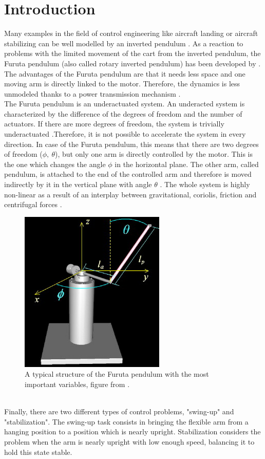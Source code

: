 \section{Introduction}
Many examples in the field of control engineering like aircraft landing or 
aircraft stabilizing can be well modelled by an inverted 
pendulum \citep{akhtaruzzaman2010modeling}. As a reaction to problems with the 
limited movement of the cart from 
the inverted pendulum, the Furuta pendulum (also called rotary inverted 
pendulum) 
has been developed by 
\cite{furuta1992swing}. The advantages of the Furuta pendulum are that 
it 
needs less space and one moving arm is directly linked to the motor. Therefore, 
the dynamics is less unmodeled thanks to a power transmission mechanism 
\citep{furuta1992swing}. \\
The Furuta pendulum is an underactuated system. An underacted system is 
characterized by the difference of the degrees of freedom and the number of 
actuators. If there are more degrees of freedom, the system is trivially 
underactuated \citep{tedrake2009underactuated}.Therefore, it is not possible to 
accelerate the system in every direction. In case of the Furuta pendulum, this 
means that there are two degrees of freedom ($\phi,\ \theta$), 
but only one arm is directly controlled by the motor. This is the one which 
changes the angle $\phi$ in the horizontal plane. The other arm, called 
pendulum, 
is attached to 
the end of the controlled arm and therefore is moved indirectly by it in the 
vertical plane with angle $\theta$ 
\citep{spong1998underactuated,tedrake2009underactuated}. The whole system is 
highly non-linear as a result of an interplay between gravitational, coriolis, 
friction and centrifugal forces \citep{izutsu2008swing}.
\begin{figure}[h]
	\centering
	\includegraphics[width=0.5\linewidth]{pendulum}
	\caption{A typical structure of the Furuta pendulum with the most important 
	variables, figure from \cite{la2009new}.}
	\label{fig:pendulum}
\end{figure}\\
Finally, there are two different types of control problems, "swing-up" and 
"stabilization". The swing-up task consists in bringing the 
flexible arm from a hanging position to a position which is nearly upright. 
Stabilization considers the problem when the arm is nearly upright with low 
enough speed, balancing it to hold this state stable. 
